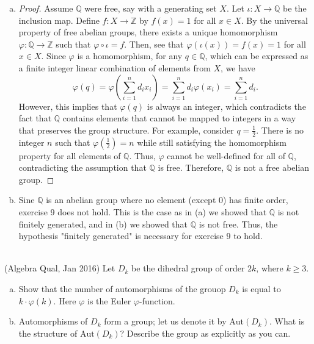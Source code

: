 \documentclass{article}
\def\zz{{\mathbb Z}}
\def\qq{{\mathbb Q}}
\begin{document}
\begin{enumerate}[(a)]
\begin{proof}
        Hence, the additive group of rationals $\qq$ is not finitely generated.
    \end{proof}
    \item \begin{proof}
        Assume $\qq$ were free, say with a generating set $X$. Let $\iota:  X \to \qq$ be the inclusion map. Define $f: X \to \zz$ by $f(x) = 1$ for all $x \in X$. By the universal property of free abelian groups, there exists a unique homomorphism $\varphi: \qq \to \zz$ such that $\varphi \circ \iota = f$. Then, see that $\varphi(\iota(x)) = f(x) = 1$ for all $x \in X$. Since $\varphi$ is a homomorphism, for any $q \in \qq$, which can be expressed as a finite integer linear combination of elements from $X$, we have
        \[
            \varphi(q) = \varphi\left(\sum_{i=1}^n d_i x_i\right) = \sum_{i=1}^n d_i \varphi(x_i) = \sum_{i=1}^n d_i.
        \]
        However, this implies that $\varphi(q)$ is always an integer, which contradicts the fact that $\qq$ contains elements that cannot be mapped to integers in a way that preserves the group structure. For example, consider $q = \frac{1}{2}$. There is no integer $n$ such that $\varphi\left(\frac{1}{2}\right) = n$ while still satisfying the homomorphism property for all elements of $\qq$. Thus, $\varphi$ cannot be well-defined for all of $\qq$, contradicting the assumption that $\qq$ is free. Therefore, $\qq$ is not a free abelian group.
    \end{proof}
    \item Sine $\qq$ is an abelian group where no element (except $0$) has finite order, exercise 9 does not hold. This is the case as in (a) we showed that $\qq$ is not finitely generated, and in (b) we showed that $\qq$ is not free. Thus, the hypothesis "finitely generated" is necessary for exercise 9 to hold.
\end{enumerate}


\begin{problem} \\ 
    (Algebra Qual, Jan 2016) Let $D_k$ be the dihedral group of order $2k$, where $k \geq 3$.
    \begin{enumerate}[(a)]
        \item Show that the number of automorphisms of the grouop $D_k$ is equal to $k \cdot \varphi(k)$. Here $\varphi$ is the Euler $\varphi$-function.
        \item Automorphisms of $D_k$ form a group; let us denote it by $\text{Aut}(D_k)$. What is the structure of $\text{Aut}(D_k)$? Describe the group as explicitly as you can.
    \end{enumerate}
\end{problem}
\end{document}

